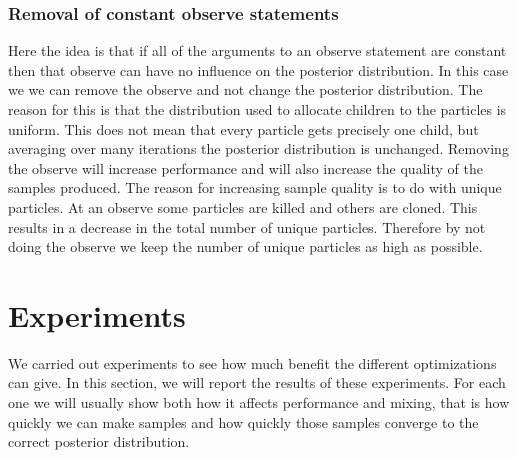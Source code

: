 \documentclass[a4paper]{article}
\begin{document}
\subsubsection{Removal of constant observe statements}

Here the idea is that if all of the arguments to an observe statement are constant then that observe can have no influence on the posterior distribution. In this case we we can remove the observe and not change the posterior distribution. The reason for this is that the distribution used to allocate children to the particles is uniform. This does not mean that every particle gets precisely one child, but averaging over many iterations the posterior distribution is unchanged. Removing the observe will increase performance and will also increase the quality of the samples produced. The reason for increasing sample quality is to do with unique particles. At an observe some particles are killed and others are cloned. This results in a decrease in the total number of unique particles. Therefore by not doing the observe we keep the number of unique particles as high as possible.




\section{Experiments}

We carried out experiments to see how much benefit the different optimizations can give. In this section, we will report the results of these experiments. For each one we will usually show both how it affects performance and mixing, that is how quickly we can make samples and how quickly those samples converge to the correct posterior distribution.



\end{document}
